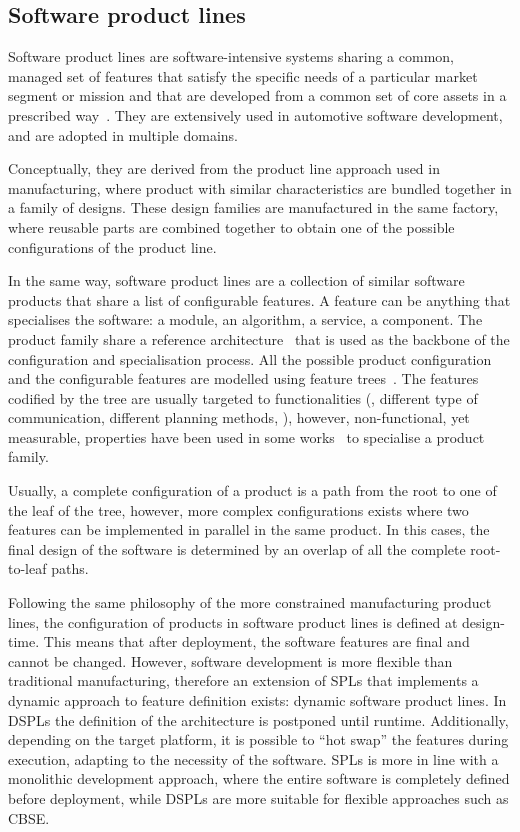 \subsection{Software product lines}
Software product lines are software-intensive systems sharing a common, managed set of features that satisfy the specific needs of a particular market segment or mission and that are developed from a common set of core assets in a prescribed way~\cite{northrop2002sei}. They are extensively used in automotive software development, and are adopted in multiple domains.

Conceptually, they are derived from the product line approach used in manufacturing, where product with similar characteristics are bundled together in a family of designs. These design families are manufactured in the same factory, where reusable parts are combined together to obtain one of the possible configurations of the product line.

In the same way, software product lines are a collection of similar software products that share a list of configurable features. A feature can be anything that specialises the software: a module, an algorithm, a service, a component. The product family share a reference architecture~\cite{nakagawa2011reference} that is used as the backbone of the configuration and specialisation process. All the possible product configuration and the configurable features are modelled using feature trees~\cite{mendonca2009splot, eriksson2009managing}. The features codified by the tree are usually targeted to functionalities (\eg, different type of communication, different planning methods, \etc), however, non-functional, yet measurable, properties have been used in some works~\cite{benavides2005automated} to specialise a product family.

Usually, a complete configuration of a product is a path from the root to one of the leaf of the tree, however, more complex configurations exists where two features can be implemented in parallel in the same product. In this cases, the final design of the software is determined by an overlap of all the complete root-to-leaf paths.

Following the same philosophy of the more constrained manufacturing product lines, the configuration of products in software product lines is defined at design-time. This means that after deployment, the software features are final and cannot be changed. However, software development is more flexible than traditional manufacturing, therefore an extension of SPLs that implements a dynamic approach to feature definition exists: dynamic software product lines. In DSPLs the definition of the architecture is postponed until runtime. Additionally, depending on the target platform, it is possible to ``hot swap'' the features during execution, adapting to the necessity of the software. SPLs is more in line with a monolithic development approach, where the entire software is completely defined before deployment, while DSPLs are more suitable for flexible approaches such as CBSE.

